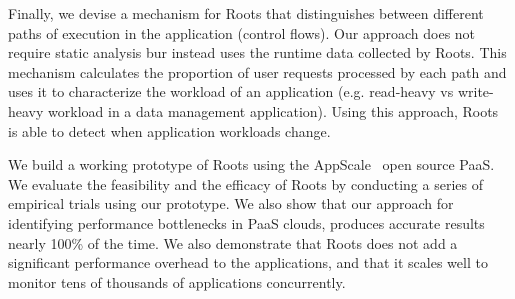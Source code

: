 Finally, we devise a mechanism for Roots that distinguishes
between different paths of execution in the application (control flows).
Our approach does not require static analysis bur instead uses the 
runtime data collected by Roots. This mechanism calculates the 
proportion of user requests processed by each path and uses it to 
characterize the workload
of an application (e.g. read-heavy vs write-heavy workload 
in a data management
application). Using this approach, Roots is able to
detect when application workloads change.

We build a working prototype of 
Roots using the AppScale~\cite{6488671} open source PaaS. We evaluate the feasibility and the 
efficacy of Roots by conducting a series of empirical trials using our prototype. 
We also show that our approach for identifying performance bottlenecks
in PaaS clouds, produces accurate results nearly 100\% of the time. 
We also demonstrate that Roots does not add a significant performance overhead
to the applications, and that it scales well to monitor tens of thousands
of applications concurrently.


